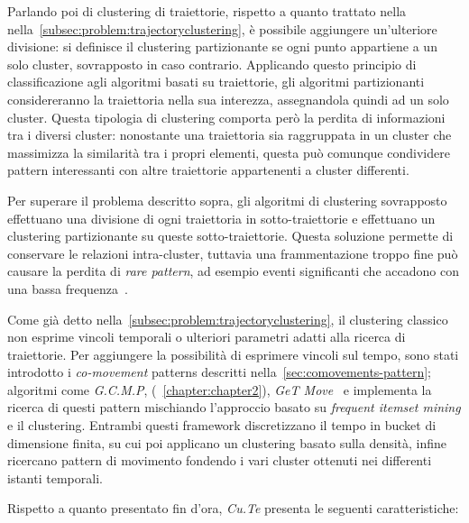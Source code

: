 Parlando poi di clustering di traiettorie, rispetto a quanto trattato nella nella~\cref{subsec:problem:trajectoryclustering}, è possibile aggiungere un'ulteriore divisione:
si definisce il clustering partizionante se ogni punto appartiene a un solo cluster, sovrapposto in caso contrario.
Applicando questo principio di classificazione agli algoritmi basati su traiettorie, gli algoritmi partizionanti considereranno la traiettoria nella sua interezza,
assegnandola quindi ad un solo cluster. Questa tipologia di clustering comporta però la perdita di informazioni tra i diversi cluster:
nonostante una traiettoria sia raggruppata in un cluster che massimizza la similarità tra i propri elementi,
questa può comunque condividere pattern interessanti con altre traiettorie appartenenti a cluster differenti.

Per superare il problema descritto sopra, gli algoritmi di clustering sovrapposto effettuano una divisione di ogni traiettoria
in sotto-traiettorie e effettuano un clustering partizionante su queste sotto-traiettorie.
Questa soluzione permette di conservare le relazioni intra-cluster, tuttavia una frammentazione troppo fine può causare
la perdita di \textit{rare pattern}, ad esempio eventi significanti che accadono con una bassa frequenza~\cite{DBLP:journals/tkdd/KohR16, DBLP:journals/geoinformatica/HuangPX06}.

Come già detto nella~\cref{subsec:problem:trajectoryclustering}, il clustering classico non esprime vincoli temporali o ulteriori parametri adatti alla ricerca di traiettorie.
Per aggiungere la possibilità di esprimere vincoli sul tempo, sono stati introdotto i \textit{co-movement} patterns descritti nella~\cref{sec:comovements-pattern}; algoritmi come \textit{G.C.M.P},
(~\cref{chapter:chapter2}), \textit{GeT Move}~\cite{DBLP:journals/ijitdm/PhanPT16} e  implementa la ricerca di questi pattern mischiando l'approccio basato su \textit{frequent itemset mining} e il clustering.
Entrambi questi framework discretizzano il tempo in bucket di dimensione finita, su cui poi applicano un clustering basato sulla densità, infine
ricercano pattern di movimento fondendo i vari cluster ottenuti nei differenti istanti temporali.

Rispetto a quanto presentato fin d'ora, \textit{Cu.Te} presenta le seguenti caratteristiche:

